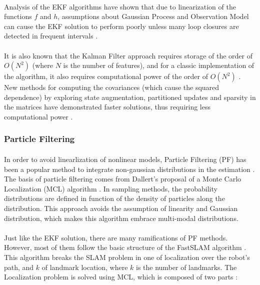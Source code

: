 \documentclass[11pt]{article}
\begin{document}
	\paragraph{}	
	 Analysis of the EKF algorithms have shown that due to linearization of the functions $f$ and $h$, assumptions about Gaussian Process and Observation Model can cause the EKF solution to perform poorly unless many loop closures are detected in frequent intervals \cite{doi:10.1177/1729881416669482}.


	\paragraph{}
	It is also known that the Kalman Filter approach requires storage of the order of $O(N^2)$ (where $N$ is the number of features), and for a classic implementation of the algorithm, it also requires computational power of the order of $O(N^2)$ \cite{CsorbaThesis}. New methods for computing the covariances (which cause the squared dependence) by exploring state augmentation, partitioned updates and sparsity in the matrices have demonstrated faster solutions, thus requiring less computational power \cite{SLAMPartII}.

	\subsubsection{Particle Filtering}
	\paragraph{} 
	In order to avoid linearlization of nonlinear models, Particle Filtering (PF) has been a popular method to integrate non-gaussian distributions in the estimation \cite{Montemerlo02fastslam:a}\cite{772544}. The basis of particle filtering comes from Dallert's proposal of a Monte Carlo Localization (MCL) algorithm \cite{772544}. In sampling methods, the probability distributions are defined in function of the density of particles along the distribution. This approach avoids the assumption of linearity and Gaussian distribution, which makes this algorithm embrace multi-modal distributions.
	
	\paragraph{}
	Just like the EKF solution, there are many ramifications of PF methods. However, most of them follow the basic structure of the FastSLAM algorithm \cite{Montemerlo02fastslam:a}. This algorithm breaks the SLAM problem in one of localization over the robot's path, and $k$ of landmark location, where $k$ is the number of landmarks. The Localization problem is solved using MCL, which is composed of two parts \cite{772544}:
	 
\end{document}
